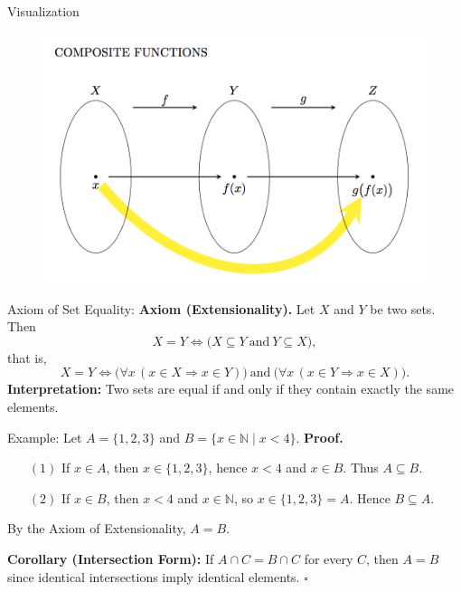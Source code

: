 \begin{frame}{Visualization}
    \begin{figure}
        \centering
        \includegraphics[width=0.8\linewidth]{Image4.png}
    \end{figure}
\end{frame}

\begin{frame}{Axiom of Set Equality:}
\textbf{Axiom (Extensionality).}  
Let $X$ and $Y$ be two sets. Then
\[
X = Y \iff \bigl( X \subseteq Y \ \text{and}\  Y \subseteq X \bigr),
\]
that is,
\[
X = Y \iff \bigl( \forall x\, (x \in X \Rightarrow x \in Y) \bigr)
\ \text{and}\ 
\bigl( \forall x\, (x \in Y \Rightarrow x \in X) \bigr).
\]
\textbf{Interpretation:} Two sets are equal if and only if they contain exactly the same elements.

\begin{exampleblock}{Example: Let $A = \{1,2,3\}$ and $B = \{x \in \mathbb{N} \mid x < 4\}$.}
\textbf{Proof.}
\begin{itemize}
  \item[$(1)$] If $x \in A$, then $x \in \{1,2,3\}$, hence $x < 4$ and $x \in B$. Thus $A \subseteq B$.
  \item[$(2)$] If $x \in B$, then $x < 4$ and $x \in \mathbb{N}$, so $x \in \{1,2,3\}=A$. Hence $B \subseteq A$.
\end{itemize}
By the Axiom of Extensionality, $A=B$.

\textbf{Corollary (Intersection Form):}  
If $A \cap C = B \cap C$ for every $C$, then $A=B$ since identical intersections imply identical elements. $\square$
\end{exampleblock}
\end{frame}

